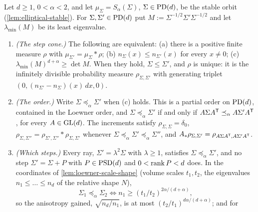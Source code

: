 \begin{proposition}
\label{prop:stable-step-cone}
\leanok
Let $d \ge 1$, $0 < \alpha < 2$, and let $\mu_\Sigma = S_\alpha(\Sigma)$, $\Sigma \in \mathrm{PD}(d)$, be the
stable orbit (\ref{lem:elliptical-stable}). For $\Sigma, \Sigma' \in \mathrm{PD}(d)$ put
$M := \Sigma^{-1/2}\Sigma'\Sigma^{-1/2}$ and let $\lambda_{\min}(M)$ be its least eigenvalue.
\begin{enumerate}
\item \emph{(The step cone.)} The following are equivalent:
(a) there is a positive finite measure $\rho$ with $\mu_{\Sigma'} = \mu_\Sigma * \rho$;
(b) $n_\Sigma(x) \le n_{\Sigma'}(x)$ for every $x \ne 0$;
(c) $\lambda_{\min}(M)^{d+\alpha} \ge \det M$.
When they hold, $\Sigma \le \Sigma'$, and $\rho$ is unique: it is the infinitely divisible probability
measure $\rho_{\Sigma,\Sigma'}$ with generating triplet $(0, (n_{\Sigma'} - n_\Sigma)(x)\,dx, 0)$.
\item \emph{(The order.)} Write $\Sigma \preceq_\alpha \Sigma'$ when (c) holds. This is a partial order
on $\mathrm{PD}(d)$, contained in the Loewner order, and $\Sigma \preceq_\alpha \Sigma'$ if and only if
$A\Sigma A^{\mathsf{T}} \preceq_\alpha A\Sigma'A^{\mathsf{T}}$, for every $A \in \mathrm{GL}(d)$. The increments satisfy
$\rho_{\Sigma,\Sigma} = \delta_0$, $\rho_{\Sigma,\Sigma''} = \rho_{\Sigma',\Sigma''} * \rho_{\Sigma,\Sigma'}$
whenever $\Sigma \preceq_\alpha \Sigma' \preceq_\alpha \Sigma''$, and
$A_*\rho_{\Sigma,\Sigma'} = \rho_{A\Sigma A^{\mathsf{T}},A\Sigma'A^{\mathsf{T}}}$.
\item \emph{(Which steps.)} Every ray, $\Sigma' = \lambda^2\Sigma$ with $\lambda \ge 1$, satisfies
$\Sigma \preceq_\alpha \Sigma'$, and no step $\Sigma' = \Sigma + P$ with $P \in \mathrm{PSD}(d)$ and
$0 < \operatorname{rank} P < d$ does. In the coordinates of \ref{lem:loewner-scale-shape} (volume scales $t_1, t_2$,
the eigenvalues $n_1 \le \dots \le n_d$ of the relative shape $N$),
\[
  \Sigma_1 \preceq_\alpha \Sigma_2 \Longleftrightarrow n_1 \ge (t_1/t_2)^{2\alpha/(d+\alpha)} ,
\]
so the anisotropy gained, $\sqrt{n_d/n_1}$, is at most $(t_2/t_1)^{d\alpha/(d+\alpha)}$; and for

\end{enumerate}
\end{proposition}
